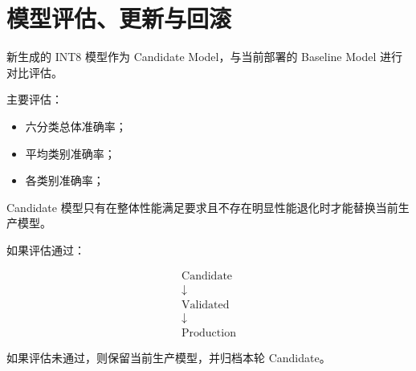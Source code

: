 \section{模型评估、更新与回滚}

新生成的 INT8 模型作为 Candidate Model，与当前部署的 Baseline Model 进行对比评估。

主要评估：

\begin{itemize}
\item 六分类总体准确率；
\item 平均类别准确率；
\item 各类别准确率；
\end{itemize}

Candidate 模型只有在整体性能满足要求且不存在明显性能退化时才能替换当前生产模型。

如果评估通过：

\[
\begin{gathered}
\text{Candidate}\\[-0.2em]
\downarrow\\[-0.2em]
\text{Validated}\\[-0.2em]
\downarrow\\[-0.2em]
\text{Production}
\end{gathered}
\]

如果评估未通过，则保留当前生产模型，并归档本轮 Candidate。

